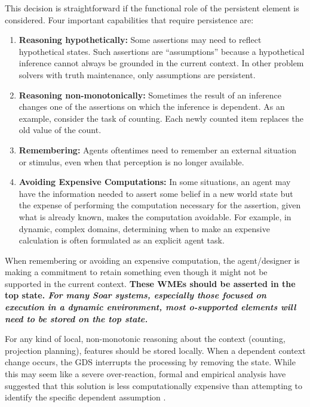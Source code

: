 This decision is straightforward if the functional role of the
persistent element is considered. Four important capabilities that
require persistence are: \vspace{-8pt}
\begin{enumerate}
	
	\item \textbf{Reasoning hypothetically:} Some assertions may need to
	reflect hypothetical states.  Such assertions are ``assumptions''
	because a hypothetical inference cannot always be grounded in the
	current context.  In other problem solvers with truth maintenance,
	only assumptions are persistent.
	\vspace{-8pt}
	\item \textbf{Reasoning non-monotonically:} 
	Sometimes the result of an inference changes one of the assertions on
	which the inference is dependent.  As an example, consider the task of
	counting.  Each newly counted item replaces the old value of the
	count. 
	\vspace{-8pt}
	\item \textbf{Remembering:} 
	Agents oftentimes need to remember an external situation or stimulus,
	even when that perception is no longer available.  
	\vspace{-8pt}
	\item \textbf{Avoiding Expensive Computations:}  In some situations,
	an agent may have the information needed to assert some belief in a
	new world state but the expense of performing the computation
	necessary for the assertion, given what is already known, makes the
	computation avoidable.  For example, in dynamic, complex domains,
	determining when to make an expensive calculation is often formulated
	as an explicit agent task\cite{Jones99:Automated}.
\end{enumerate}

When remembering or avoiding an expensive computation, the
agent/designer is making a commitment to retain something even though
it might not be supported in the current context. \textbf{These
	WMEs should be asserted in the top state. \emph{For many Soar systems,
		especially those focused on execution in a dynamic environment, 
		most o-supported elements will need to be stored on the top state.}} 

For any kind of local, non-monotonic reasoning about the context
(counting, projection planning), features should be stored locally.
When a dependent context change occurs, the GDS interrupts the
processing by removing the state. While this may seem like a severe
over-reaction, formal and empirical analysis have suggested that this
solution is less computationally expensive than attempting to identify
the specific dependent assumption \cite{Wray03:Ensuring}.

